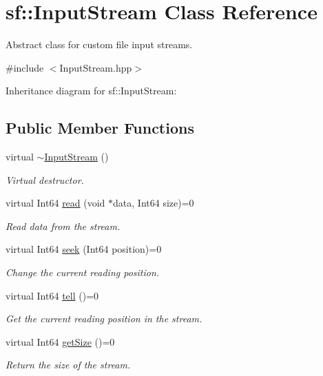 \hypertarget{classsf_1_1_input_stream}{}\section{sf\+:\+:Input\+Stream Class Reference}
\label{classsf_1_1_input_stream}


Abstract class for custom file input streams.  




{\ttfamily \#include $<$Input\+Stream.\+hpp$>$}



Inheritance diagram for sf\+:\+:Input\+Stream\+:
\subsection*{Public Member Functions}
\begin{DoxyCompactItemize}
\item 
\mbox{\label{classsf_1_1_input_stream_a4b2eb0f92323e630bd0542bc6191682e}} 
virtual \hyperlink{classsf_1_1_input_stream_a4b2eb0f92323e630bd0542bc6191682e}{$\sim$\+Input\+Stream} ()
\begin{DoxyCompactList}\small\item\em Virtual destructor. \end{DoxyCompactList}\item 
virtual Int64 \hyperlink{classsf_1_1_input_stream_a8dd89c74c1acb693203f50e750c6ae53}{read} (void $\ast$data, Int64 size)=0
\begin{DoxyCompactList}\small\item\em Read data from the stream. \end{DoxyCompactList}\item 
virtual Int64 \hyperlink{classsf_1_1_input_stream_a76aba8e5d5cf9b1c5902d5e04f7864fc}{seek} (Int64 position)=0
\begin{DoxyCompactList}\small\item\em Change the current reading position. \end{DoxyCompactList}\item 
virtual Int64 \hyperlink{classsf_1_1_input_stream_a599515b9ccdbddb6fef5a98424fd559c}{tell} ()=0
\begin{DoxyCompactList}\small\item\em Get the current reading position in the stream. \end{DoxyCompactList}\item 
virtual Int64 \hyperlink{classsf_1_1_input_stream_a311eaaaa65d636728e5153b574b72d5d}{get\+Size} ()=0
\begin{DoxyCompactList}\small\item\em Return the size of the stream. \end{DoxyCompactList}\end{DoxyCompactItemize}


